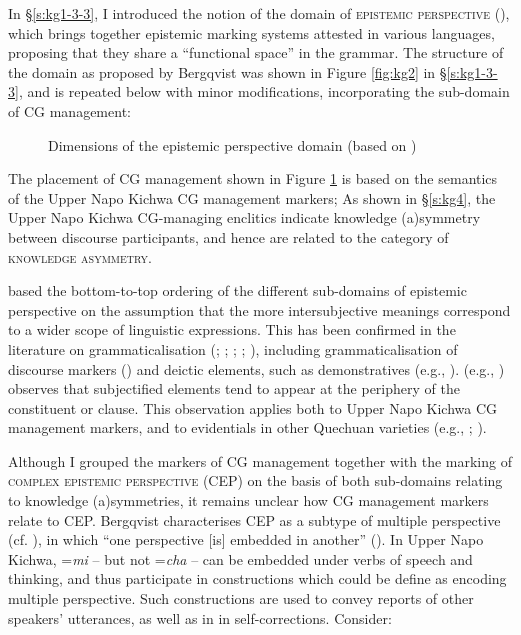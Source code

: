 \documentclass[output=paper]{langscibook}
\begin{document}
In §\ref{s:kg1-3-3}, I introduced the notion of the domain of \textsc{epistemic perspective} (\citealt{Bergqvist2017}), which brings together epistemic marking systems attested in various languages, proposing that they share a “functional space” in the grammar. The structure of the domain as proposed by Bergqvist was shown in Figure \ref{fig:kg2} in §\ref{s:kg1-3-3}‎, and is repeated below with minor modifications, incorporating the sub-domain of CG management:

\begin{figure}
\missingfigure{}
\caption{Dimensions of the epistemic perspective domain (based on \citealt[12]{Bergqvist2017})}
\label{fig:kg4}
\end{figure}

The placement of CG management shown in Figure \ref{fig:kg4} is based on the semantics of the Upper Napo Kichwa CG management markers; As shown in §‎\ref{s:kg4}, the Upper Napo Kichwa CG-managing enclitics indicate knowledge (a)symmetry between discourse participants, and hence are related to the category of \textsc{knowledge asymmetry}.

\cite{Bergqvist2017} based the bottom-to-top ordering of the different sub-domains of epistemic perspective on the assumption that the more intersubjective meanings correspond to a wider scope of linguistic expressions. This has been confirmed in the literature on grammaticalisation (\citealt{Traugott1995}; \citeyear{Traugott2003}; \citeyear{Traugott2010}; \citeyear{Traugott2012}; \citealt{Traugott2002}), including grammaticalisation of discourse markers (\citealt{Traugott1995}) and deictic elements, such as demonstratives (e.g., \citealt{Kratochvil2011}). \citeauthor{Traugott2010} (e.g., \citeyear{Traugott2010}) observes that subjectified elements tend to appear at the periphery of the constituent or clause. This observation applies both to Upper Napo Kichwa CG management markers, and to evidentials in other Quechuan varieties (e.g., \citealt{Muysken1995}; \citealt{Sanchez2015}).

Although I grouped the markers of CG management together with the marking of \textsc{complex epistemic perspective} (CEP) on the basis of both sub-domains relating to knowledge (a)symmetries, it remains unclear how CG management markers relate to CEP. Bergqvist characterises CEP as a subtype of multiple perspective (cf. \citealt{Evans2005}), in which “one perspective [is] embedded in another” (\citealt[6]{Bergqvist2017}). In Upper Napo Kichwa, =\textit{mi} – but not =\textit{cha} – can be embedded under verbs of speech and thinking, and thus participate in constructions which could be define as encoding multiple perspective. Such constructions are used to convey reports of other speakers’ utterances, as well as in in self-corrections. Consider:
\end{document}
